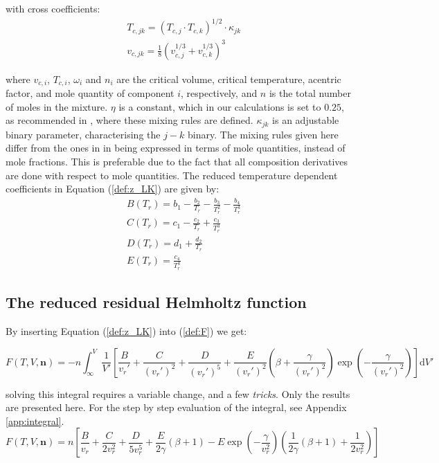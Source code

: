 \documentclass[internal,english]{sintefmemo2012}
\numberwithin{equation}{section}
\newcommand*{\reff}[1]{(\ref{#1})}
\begin{document}
with cross coefficients:
\begin{align}
& T_{c,jk} = (T_{c,j} \cdot T_{c,k})^{1/2} \cdot \kappa_{jk} \\
& v_{c,jk} = \frac{1}{8}(v_{c,j}^{1/3} + v_{c,k}^{1/3})^3 
\end{align}

where $v_{c,i}$, $T_{c,i}$, $\omega_i$ and $n_i$ are the critical volume,  critical temperature, acentric factor, and mole quantity of component $i$, respectively, and $n$ is the total number of moles in the mixture. $\eta$ is a constant, which in our calculations is set to $0.25$, as recommended in \cite{PKP}, where these mixing rules are defined. $\kappa_{jk}$ is an adjustable binary parameter, characterising the $j-k$ binary. The mixing rules given here differ from the ones in \cite{PKP} in being expressed in terms of mole quantities, instead of mole fractions. This is preferable due to the fact that all composition derivatives are done with respect to mole quantities. The reduced temperature dependent coefficients in Equation \reff{def:z_LK} are given by:
\begin{align}
\label{eq:B}
& B(T_r) = b_1 - \frac{b_2}{T_r} - \frac{b_3}{T_r^2} - \frac{b_4}{T_r^3} \\
& C(T_r) = c_1 - \frac{c_2}{T_r} + \frac{c_3}{T_r^3} \\
& D(T_r) = d_1 + \frac{d_2}{T_r} \\
\label{eq:E}
& E(T_r) = \frac{c_4}{T_r^3} 
\end{align}

\subsection{The reduced residual Helmholtz function}
By inserting Equation \reff{def:z_LK} into \reff{def:F} we get:

\begin{equation}
F(T,V,\textbf{n}) = - n \int_\infty ^V \frac{1}{V'} \left[\frac{B}{v_r '} + \frac{C}{(v_r ') ^2 } + \frac{D}{(v_r ')^5} + \frac{E}{(v_r ')^2} \left( \beta + \frac{\gamma}{(v_r ')^2} \right) \exp{\left(-\frac{\gamma}{(v_r ')^2}\right)} \right] \mathrm{d}V'
\end{equation}

solving this integral requires a variable change, and a few \textit{tricks}. Only the results are presented here. For the step by step evaluation of the integral, see Appendix \ref{app:integral}. 
\begin{equation}
\label{def:F_LK}
F(T,V,\textbf{n}) = n\left[\frac{B}{v_r} + \frac{C}{2v_r^2} + \frac{D}{5v_r^5} + \frac{E}{2 \gamma} (\beta + 1) - E \exp \left(-\frac{\gamma}{v_r^2}\right) \left(\frac{1}{2\gamma} (\beta +1) + \frac{1}{2v_r^2}\right) \right]
\end{equation}
\end{document}
